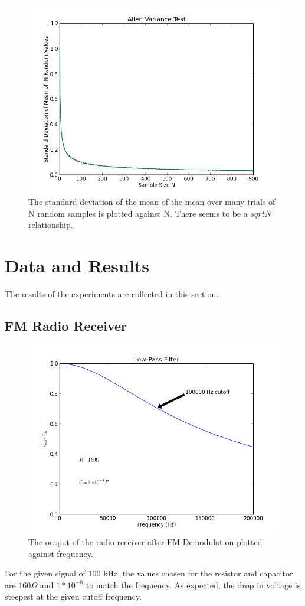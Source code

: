 \documentclass[12pt]{article}
\begin{document}
\begin{figure}[H]
\centering
\includegraphics[width=.9\textwidth]{allen_variance_test.png}
\caption{The standard deviation of the mean of the mean over many trials
  of N random samples is plotted against N. There seems to be a
  $sqrt{N}$ relationship.}
\end{figure}
\section{Data and Results}
The results of the experiments are collected in this section.
\subsection{FM Radio Receiver}
\begin{figure}[H]
\centering
\includegraphics[width=.9\textwidth]{low_pass_filter.png}
\caption{The output of the radio receiver after FM Demodulation plotted
  against frequency.}
\end{figure}
For the given signal of 100 kHz, the values chosen for the resistor and
capacitor are $160\Omega$ and $1*10^{-8}$ to match the frequency. As
expected, the drop in voltage is steepest at the given cutoff
frequency. 
\end{document}
